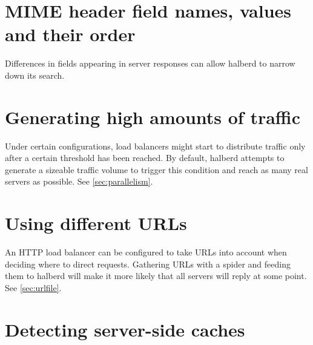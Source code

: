 \documentclass[a4paper]{book}
\begin{document}
\section{MIME header field names, values and their order}

Differences in fields appearing in server responses can allow halberd to
narrow down its search.

%

\section{Generating high amounts of traffic}

Under certain configurations, load balancers might start to distribute traffic
only after a certain threshold has been reached.  By default, halberd attempts
to generate a sizeable traffic volume to trigger this condition and reach as
many real servers as possible. See \ref{sec:parallelism}.


\section{Using different URLs}

An HTTP load balancer can be configured to take URLs into account when deciding
where to direct requests. Gathering URLs with a spider and feeding them to
halberd will make it more likely that all servers will reply at some point.
See \ref{sec:urlfile}.

\section{Detecting server-side caches}
\end{document}
